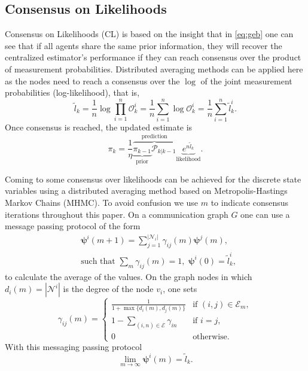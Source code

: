 \documentclass[journal]{IEEEtran}
\newcommand{\vect}[1]{{\mathbf{#1}}}
\theoremstyle{remark}
\theoremstyle{definition}
\begin{document}
\subsection{Consensus on Likelihoods}
Consensus on Likelihoods (CL) is based on the insight that in \eqref{eq:geb}
one can see that if all agents share the same prior information, they will
recover the centralized estimator's performance if they can reach 
consensus over the product of measurement probabilities. Distributed averaging methods
can be applied here as the nodes need to reach a consensus over the $\log$ of
the joint measurement probabilities (log-likelihood), that is,
\begin{equation}
\tilde{l}_k  = \frac{1}{n} \log \prod_{i=1}^{n} \mathcal{O}_k^i  = \frac{1}{n} \sum_{i=1}^{n} \log \mathcal{O}_k^i = \frac{1}{n} \sum_{i=1}^{n} \tilde{l}_k^i.
\end{equation}
Once consensus is reached, the updated estimate is 
\begin{equation}
\label{eq:dlc}
{\pi}_{k}  = \frac{1}{\eta}\overbrace{ \underbrace{{\pi}_{k-1}}_{\text{prior}} 
\mathcal{P}_{k \vert k-1}  
}^{\text{prediction}}\underbrace{e^{n\tilde{l}_k}}_{\text{likelihood}}.
\end{equation}

Coming to some consensus over likelihoods can be achieved for the discrete state variables using a distributed averaging method based on Metropolis-Hastings Markov Chains (MHMC). To avoid confusion we use $m$ to indicate consensus iterations throughout this paper. On a communication graph $G$ one can use a message passing protocol of the form 
\begin{align}
&\vect{\psi}^i(m+1)=\textstyle {\sum\nolimits _{j=1}^{|\mathcal{N}_{i}|}} \gamma_{ij}(m)\vect{\psi}^j(m),\\
& \text{such that } \sum_{m}  \gamma_{ij}(m) = 1,\,\,  \vect{\psi}^i(0)=  \tilde{l}_k^i,\nonumber
\end{align}
to calculate the average of the values.
On the graph nodes in which $d_{i}(m)=|\mathcal{N}^i|$ is the degree of the node $v_i$, 
one sets
\begin{equation}
\label{eq:mhmc}
\gamma_{ij}(m) =
\begin{cases}
{\frac{1}{1+\max\{d_{i}(m),d_{j}(m)\}}}      &  \text{if } (i,j) \in \mathcal{E}_{m}, \\
1-\sum\limits_{{(i,n)} \in \mathcal{E}}\gamma_{in}  &  \text{if } i = j,\\
0 & \text{otherwise}.
\end{cases}
\end{equation}
With this messaging passing protocol $$\lim_{m\rightarrow \infty} \vect{\psi}^i(m) = \tilde{l}_k.$$
\end{document}
